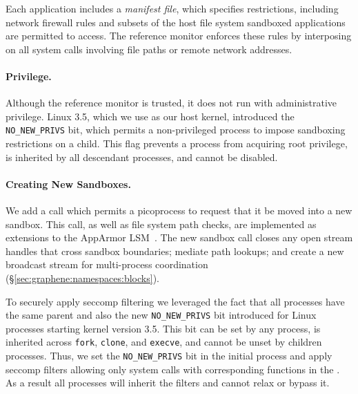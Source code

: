 Each application includes a \emph{manifest file}, which specifies restrictions,
including network firewall rules and subsets of the host file system sandboxed
applications are permitted to access.  The reference monitor enforces these
rules by interposing on all system calls involving file paths or remote network addresses.

\paragraph{Privilege.~} 
Although the reference monitor is trusted, it does not run 
with administrative privilege.
Linux 3.5, which we use as our host kernel, 
introduced the {\tt NO\_NEW\_PRIVS} bit, which permits
a non-privileged process to impose sandboxing restrictions on a child.
This flag prevents a process from acquiring root privilege, %
is inherited by all descendant processes,
and cannot be disabled.

\paragraph{Creating New Sandboxes.~} We add a \pal{} call which
permits a picoprocess to request that it be moved into a new sandbox.
This call, as well as file system path checks, are implemented
as extensions to the  AppArmor LSM~\cite{apparmor}.
The new sandbox call closes any open stream handles that cross sandbox boundaries;
mediate path lookups;
and create a new broadcast stream for multi-process
 coordination (\S\ref{sec:graphene:namespaces:blocks}).

To securely apply seccomp filtering we leveraged the fact that all
\graphene{} processes have the same parent and also the new
{\tt NO\_NEW\_PRIVS} bit introduced for Linux processes starting kernel
version 3.5. This bit can be set by any process, is inherited across
{\tt fork}, {\tt clone}, and {\tt execve}, and cannot be unset by
children processes. Thus, we set the {\tt NO\_NEW\_PRIVS} bit in the initial
\graphene{} process and apply seccomp filters allowing only system calls
with corresponding functions in the \pal{}. As a result all \graphene{}
processes will inherit the filters and cannot relax or bypass it.



